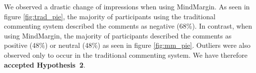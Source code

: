 We observed a drastic change of impressions when using MindMargin. As seen in figure \ref{fig:trad_pie}, the majority of participants using the traditional commenting system described the comments as negative (68\%). In contrast, when using MindMargin, the majority of participants described the comments as positive (48\%) or neutral (48\%) as seen in figure \ref{fig:mm_pie}.  Outliers were also observed only to occur in the traditional commenting system. We have therefore \textbf{accepted Hypothesis~2}. 



